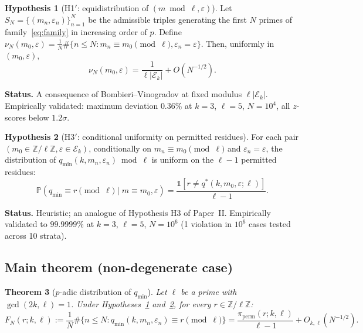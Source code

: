 \documentclass[11pt,a4paper]{article}
\theoremstyle{plain}
\newtheorem{theorem}{Theorem}[section]
\theoremstyle{definition}
\newtheorem{hypothesis}[theorem]{Hypothesis}
\newcommand{\qmin}{q_{\min}}
\newcommand{\Z}{\mathbb{Z}}
\newcommand{\Prb}{\mathbb{P}}
\newcommand{\PiP}{\pi_{\mathrm{perm}}}
\newcommand{\eps}{\varepsilon}
\newcommand{\Eclass}{\mathcal{E}}
\begin{document}
\begin{heuristicbox}
\begin{hypothesis}[H1$'$: equidistribution of $(m \bmod \ell, \eps)$]\label{hyp:H1prime}
Let $S_N = \{(m_n, \eps_n)\}_{n=1}^N$ be the admissible triples generating the
first $N$ primes of family~\eqref{eq:family} in increasing order of $p$. Define
$\nu_N(m_0, \eps) = \frac{1}{N} \#\{n \le N : m_n \equiv m_0 \pmod \ell, \eps_n = \eps\}$.
Then, uniformly in $(m_0, \eps)$,
\[
\nu_N(m_0, \eps) = \frac{1}{\ell |\Eclass_k|} + O(N^{-1/2}).
\]
\end{hypothesis}
\textbf{Status.} A consequence of Bombieri--Vinogradov at fixed modulus
$\ell |\Eclass_k|$. Empirically validated: maximum deviation $0.36\%$ at
$k=3$, $\ell=5$, $N=10^4$, all $z$-scores below $1.2\sigma$.
\end{heuristicbox}

\begin{heuristicbox}
\begin{hypothesis}[H3$'$: conditional uniformity on permitted residues]\label{hyp:H3prime}
For each pair $(m_0 \in \Z/\ell\Z, \eps \in \Eclass_k)$, conditionally on
$m_n \equiv m_0 \pmod \ell$ and $\eps_n = \eps$, the distribution of
$\qmin(k, m_n, \eps_n) \bmod \ell$ is uniform on the $\ell-1$ permitted residues:
\[
\Prb\!\left(\qmin \equiv r \pmod \ell \mid m \equiv m_0, \eps\right)
= \frac{\mathbb{1}[r \neq q^*(k, m_0, \eps; \ell)]}{\ell - 1}.
\]
\end{hypothesis}
\textbf{Status.} Heuristic; an analogue of Hypothesis H3 of Paper~II. Empirically
validated to $99.9999\%$ at $k=3$, $\ell=5$, $N = 10^6$ (1 violation in $10^6$
cases tested across 10 strata).
\end{heuristicbox}

\subsection{Main theorem (non-degenerate case)}

\begin{heuristicbox}
\begin{theorem}[$p$-adic distribution of $\qmin$]\label{thm:main}
Let $\ell$ be a prime with $\gcd(2k, \ell) = 1$. Under
Hypotheses~\ref{hyp:H1prime} and~\ref{hyp:H3prime}, for every $r \in \Z/\ell\Z$:
\begin{equation}
F_N(r; k, \ell) := \frac{1}{N} \#\{n \le N : \qmin(k, m_n, \eps_n) \equiv r \pmod \ell\}
= \frac{\PiP(r; k, \ell)}{\ell - 1} + O_{k, \ell}(N^{-1/2}).
\label{eq:main}
\end{equation}
\end{theorem}
\end{heuristicbox}
\end{document}
